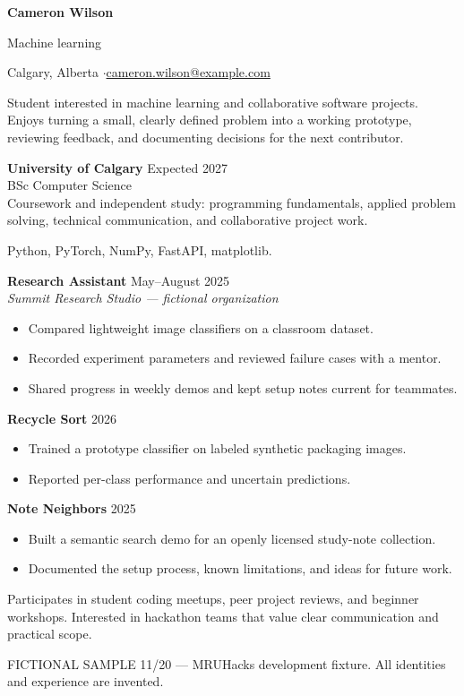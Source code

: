 
{\Huge\bfseries Cameron Wilson}\par
{\large\color{accent} Machine learning}\par
Calgary, Alberta \enspace$\cdot$\enspace \href{mailto:cameron.wilson@example.com}{cameron.wilson@example.com}

Student interested in machine learning and collaborative software projects.
Enjoys turning a small, clearly defined problem into a working prototype,
reviewing feedback, and documenting decisions for the next contributor.

\textbf{University of Calgary} \hfill Expected 2027\\
BSc Computer Science\\
Coursework and independent study: programming fundamentals, applied problem solving,
technical communication, and collaborative project work.

Python, PyTorch, NumPy, FastAPI, matplotlib.

\textbf{Research Assistant} \hfill May--August 2025\\
\textit{Summit Research Studio --- fictional organization}
\begin{itemize}
\item Compared lightweight image classifiers on a classroom dataset.
\item Recorded experiment parameters and reviewed failure cases with a mentor.
\item Shared progress in weekly demos and kept setup notes current for teammates.
\end{itemize}

\textbf{Recycle Sort} \hfill 2026
\begin{itemize}
\item Trained a prototype classifier on labeled synthetic packaging images.
\item Reported per-class performance and uncertain predictions.
\end{itemize}
\textbf{Note Neighbors} \hfill 2025
\begin{itemize}
\item Built a semantic search demo for an openly licensed study-note collection.
\item Documented the setup process, known limitations, and ideas for future work.
\end{itemize}

Participates in student coding meetups, peer project reviews, and beginner workshops.
Interested in hackathon teams that value clear communication and practical scope.

\vfill
{\footnotesize\color{gray} FICTIONAL SAMPLE 11/20 --- MRUHacks development fixture.
All identities and experience are invented.}


